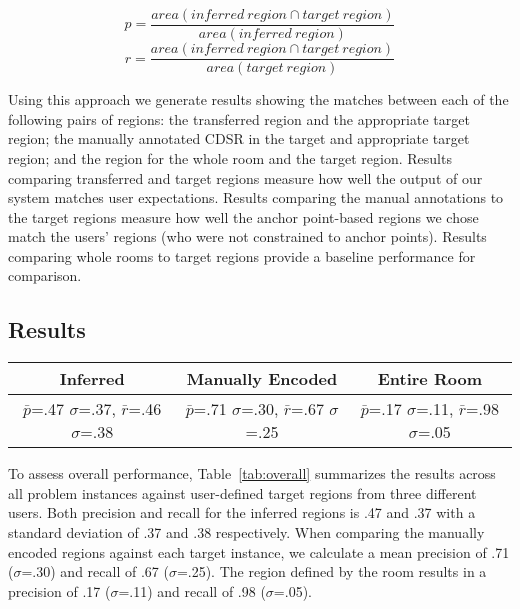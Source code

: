 \begin{equation}
	p=\frac{area(inferred\ region \cap target\ region)}{area(inferred\ region)}
\end{equation}
\begin{equation}
	r=\frac{area(inferred\ region \cap target\ region)}{area(target\ region)}
\end{equation}

Using this approach we generate results showing the matches between each of the following pairs of regions: the transferred region and the appropriate target region; the manually annotated CDSR in the target and appropriate target region; and the region for the whole room and the target region. 
 Results comparing transferred and target regions measure how well the output of our system matches user expectations. Results comparing the manual annotations to the target regions measure how well the anchor point-based regions we chose match the users' regions (who were not constrained to anchor points). Results comparing whole rooms to target regions provide a baseline performance for comparison. 


\subsection{Results}
\begin{table*}
	\center
\begin{tabular}{|c|c|c|}
\hline
Inferred & Manually Encoded & Entire Room \\
\hline
$\bar{p}$=.47 $\sigma$=.37, $\bar{r}$=.46 $\sigma$=.38 & $\bar{p}$=.71 $\sigma$=.30, $\bar{r}$=.67 $\sigma$=.25 & $\bar{p}$=.17 $\sigma$=.11, $\bar{r}$=.98 $\sigma$=.05  \\
\hline
\end{tabular}
\caption{Overall Performance}
  \label{tab:overall}	

\end{table*}

To assess overall performance, Table~\ref{tab:overall} summarizes the results across all problem instances against user-defined target regions from three different users. Both precision and recall for the inferred regions is .47 and .37 with a standard deviation of .37 and .38 respectively. When comparing the manually encoded regions against each target instance, we calculate a mean precision of .71 ($\sigma$=.30) and recall of .67 ($\sigma$=.25). The region defined by the room results in a precision of .17 ($\sigma$=.11) and recall of .98 ($\sigma$=.05).

